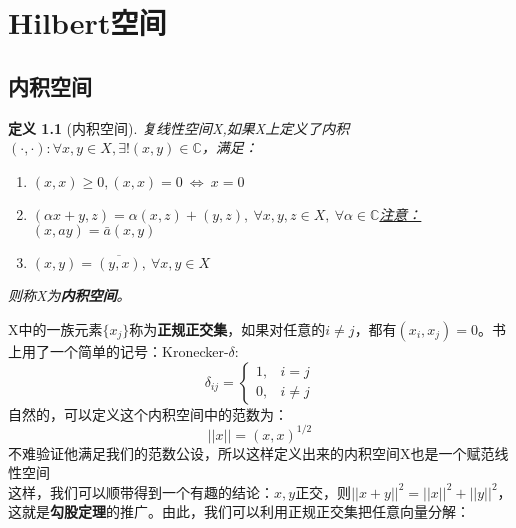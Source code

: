 \documentclass[12pt, a4paper, oneside, fontset=windows]{ctexbook}
\newtheorem{definition}{定义}[section]
\begin{document}
    \chapter{Hilbert空间}
    \section{内积空间}
    \begin{definition}[内积空间]
        复线性空间X,如果X上定义了内积$(\cdot ,\cdot ):\forall x,y\in X,\exists !(x,y) \in \mathbb{C}$，满足：
        \begin{enumerate}
            \item $(x,x)\ge 0,(x,x)=0 \  \iff \  x=0$
            \item $(\alpha x+y,z)=\alpha (x,z)+(y,z),\ \forall x,y,z\in X,\ \forall \alpha \in \mathbb{C}$\quad \underline{注意：$(x,ay)=\bar{a}(x,y)$}
            \item $(x,y)=\overline{(y,x)},\ \forall x,y\in X$
        \end{enumerate}
        则称X为\textbf{内积空间}。
    \end{definition}

    X中的一族元素$\{x_j\}$称为\textbf{正规正交集}，如果对任意的$i\neq j$，都有$(x_i,x_j)=0$。书上用了一个简单的记号：Kronecker-$\delta$:
    \[
        \delta_{ij}=
        \begin{cases}
            1, & i=j \\
            0, & i\neq j
        \end{cases}
    \]
    自然的，可以定义这个内积空间中的范数为：
    \[||x||={(x,x)}^{1/2}\]
    不难验证他满足我们的范数公设，所以这样定义出来的内积空间X也是一个赋范线性空间\\
    这样，我们可以顺带得到一个有趣的结论：$x,y$正交，则$||x+y||^2=||x||^2+||y||^2$，这就是\textbf{勾股定理}的推广。由此，我们可以利用正规正交集把任意向量分解：\\
\end{document}
